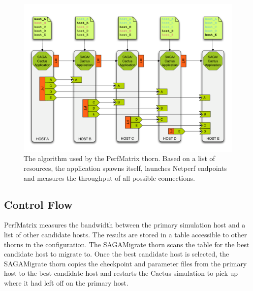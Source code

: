 \documentclass[conference,final]{IEEEtran}
\begin{document}
\begin{figure}
 \begin{center}
 \includegraphics[scale=0.30]{./figures/figure_01}
 \end{center}
 \caption{The algorithm used by the PerfMatrix thorn. Based on a list of resources, the application spawns itself, launches Netperf endpoints and measures the throughput of all possible connections. }
 \label{fig:algo}
 \end{figure}

 \subsection{Control Flow} 


PerfMatrix measures the bandwidth between the primary simulation host
and a list of other candidate hosts. The results are stored in a
table accessible to other thorns in the configuration. The
SAGAMigrate thorn scans the table for the best candidate host to
migrate to. Once the best candidate host is selected, the SAGAMigrate
thorn copies the checkpoint and parameter files from the primary host
to the best candidate host and restarts the Cactus simulation to pick
up where it had left off on the primary host.
\end{document}

